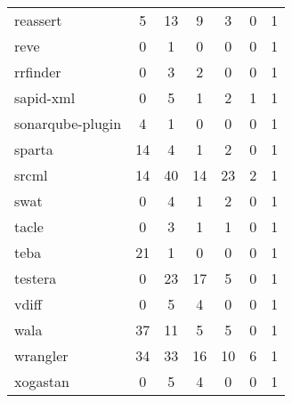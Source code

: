 \begin{table}[H]
\begin{tabular}{| l | c | c | c | c | c | c |}
  reassert
  &
  5
  &
  13
  &
  9
  &
  3
  &
  0
  &
  1
  \\
  reve
  &
  0
  &
  1
  &
  0
  &
  0
  &
  0
  &
  1
  \\
  rrfinder
  &
  0
  &
  3
  &
  2
  &
  0
  &
  0
  &
  1
  \\
  sapid-xml
  &
  0
  &
  5
  &
  1
  &
  2
  &
  1
  &
  1
  \\
  sonarqube-plugin
  &
  4
  &
  1
  &
  0
  &
  0
  &
  0
  &
  1
  \\
  sparta
  &
  14
  &
  4
  &
  1
  &
  2
  &
  0
  &
  1
  \\
  srcml
  &
  14
  &
  40
  &
  14
  &
  23
  &
  2
  &
  1
  \\
  swat
  &
  0
  &
  4
  &
  1
  &
  2
  &
  0
  &
  1
  \\
  tacle
  &
  0
  &
  3
  &
  1
  &
  1
  &
  0
  &
  1
  \\
  teba
  &
  21
  &
  1
  &
  0
  &
  0
  &
  0
  &
  1
  \\
  testera
  &
  0
  &
  23
  &
  17
  &
  5
  &
  0
  &
  1
  \\
  vdiff
  &
  0
  &
  5
  &
  4
  &
  0
  &
  0
  &
  1
  \\
  wala
  &
  37
  &
  11
  &
  5
  &
  5
  &
  0
  &
  1
  \\
  wrangler
  &
  34
  &
  33
  &
  16
  &
  10
  &
  6
  &
  1
  \\
  xogastan
  &
  0
  &
  5
  &
  4
  &
  0
  &
  0
  &
  1
  \\
  \hline
\end{tabular}
\end{table}

